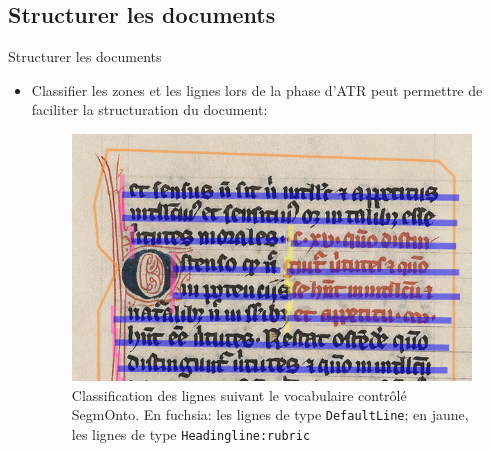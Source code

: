 \documentclass[11pt,aspectratio=169]{beamer}
\begin{document}
\subsection{Structurer les documents}
\begin{frame}{Structurer les documents}
\begin{center}
\begin{itemize}
\item Classifier les zones et les lignes lors de la phase d'ATR peut permettre de faciliter la structuration du document:
\begin{figure}
\includegraphics[width=.45\textwidth]{img/segmentation_lignes.png}
\caption{Classification des lignes suivant le vocabulaire contrôlé SegmOnto. En fuchsia: les lignes de type \texttt{DefaultLine}; en jaune, les lignes de type \texttt{Headingline:rubric}}
\end{figure}
\end{itemize}
\end{center}
\end{frame}
\end{document}
